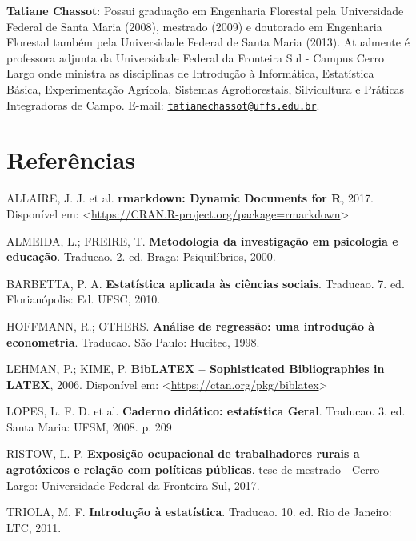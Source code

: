 \documentclass[12pt,brazil,oneside]{book}
\begin{document}
\textbf{Tatiane Chassot}: Possui graduação em Engenharia Florestal pela
Universidade Federal de Santa Maria (2008), mestrado (2009) e doutorado
em Engenharia Florestal também pela Universidade Federal de Santa Maria
(2013). Atualmente é professora adjunta da Universidade Federal da
Fronteira Sul - Campus Cerro Largo onde ministra as disciplinas de
Introdução à Informática, Estatística Básica, Experimentação Agrícola,
Sistemas Agroflorestais, Silvicultura e Práticas Integradoras de Campo.
E-mail:
\href{mailto:tatianechassot@uffs.edu.br}{\nolinkurl{tatianechassot@uffs.edu.br}}.

\hypertarget{referencias}{%
\chapter*{Referências}\label{referencias}}

\hypertarget{refs}{}
\leavevmode\hypertarget{ref-R-rmarkdown}{}%
ALLAIRE, J. J. et al. \textbf{rmarkdown: Dynamic Documents for R}, 2017.
Disponível em:
\textless{}\url{https://CRAN.R-project.org/package=rmarkdown}\textgreater{}

\leavevmode\hypertarget{ref-almeida2000}{}%
ALMEIDA, L.; FREIRE, T. \textbf{Metodologia da investigação em
psicologia e educação}. Traducao. 2. ed. Braga: Psiquilíbrios, 2000.

\leavevmode\hypertarget{ref-barbetta1988}{}%
BARBETTA, P. A. \textbf{Estatística aplicada às ciências sociais}.
Traducao. 7. ed. Florianópolis: Ed. UFSC, 2010.

\leavevmode\hypertarget{ref-hoffmann1998}{}%
HOFFMANN, R.; OTHERS. \textbf{Análise de regressão: uma introdução à
econometria}. Traducao. São Paulo: Hucitec, 1998.

\leavevmode\hypertarget{ref-biblatex}{}%
LEHMAN, P.; KIME, P. \textbf{BibLATEX -- Sophisticated Bibliographies in
LATEX}, 2006. Disponível em:
\textless{}\url{https://ctan.org/pkg/biblatex}\textgreater{}

\leavevmode\hypertarget{ref-lopes2008}{}%
LOPES, L. F. D. et al. \textbf{Caderno didático: estatística Geral}.
Traducao. 3. ed. Santa Maria: UFSM, 2008. p. 209

\leavevmode\hypertarget{ref-Ristow2017}{}%
RISTOW, L. P. \textbf{Exposição ocupacional de trabalhadores rurais a
agrotóxicos e relação com políticas públicas}. tese de mestrado---Cerro
Largo: Universidade Federal da Fronteira Sul, 2017.

\leavevmode\hypertarget{ref-triola1999}{}%
TRIOLA, M. F. \textbf{Introdução à estatística}. Traducao. 10. ed. Rio
de Janeiro: LTC, 2011.
\end{document}
